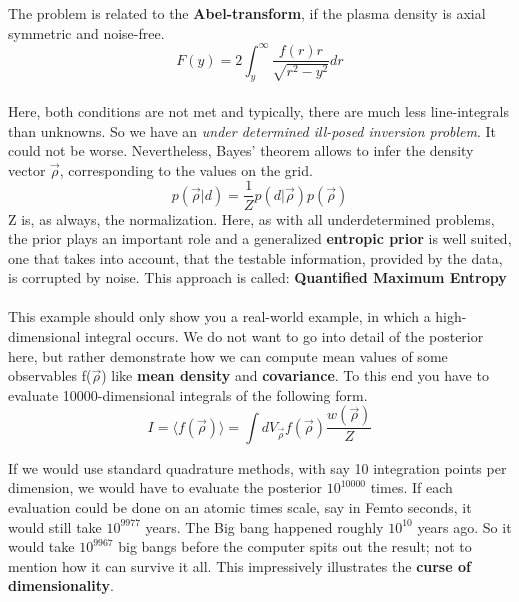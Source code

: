 \documentclass[12pt, a4paper]{scrartcl}
\begin{document}
The problem is related to the  \textbf{Abel-transform}, if the plasma density is axial
symmetric and noise-free. 
\begin{equation*}\boxed{F(y)=2\int_y^{\infty}\frac{f(r)r}{\sqrt{r^2-y^2}}dr
}\end{equation*}\\
Here, both conditions are not met and typically,
there are much less line-integrals than unknowns. So we have an \textit{under determined ill-posed inversion problem}. It could not be worse.
Nevertheless, Bayes’ theorem allows to infer the density vector $\vec{\rho}$, corresponding to the values on the grid.
\[p(\vec{\rho}|d)=\frac 1Z p(d|\vec{\rho})p(\vec{\rho})\]
Z is, as always, the normalization. Here, as with all underdetermined problems, the prior plays an important role and a generalized \textbf{entropic prior} is well suited, one that takes into account, that the testable information, provided by the data, is corrupted by noise. This approach is called:  \textbf{Quantiﬁed Maximum Entropy}\\

\\

This example should only show you a real-world example, in which a high-dimensional integral occurs. We do not want to go into detail of the posterior
here, but rather demonstrate how we can compute mean values of some
observables f($\vec{\rho}$) like  \textbf{mean density} and  \textbf{covariance}. To this end you have to
evaluate 10000-dimensional integrals of the following form.
\[I=\langle f(\vec{\rho})\rangle = \int dV_{\vec{\rho}}f(\vec{\rho})\frac{w(\vec{\rho})}{Z}\]

If we would use standard quadrature methods, with say 10 integration points
per dimension, we would have to evaluate the posterior $10^{10000}$
times. If each evaluation could be done on an atomic times scale, say in
Femto seconds, it would still take $10^{9977}$ years. The Big bang happened
roughly $10^{10}$ years ago. So it would take $10^{9967}$ big bangs before the computer spits out the result; not to mention how it can survive it all. This impressively
illustrates the  \textbf{curse of dimensionality}.\\
\end{document}
